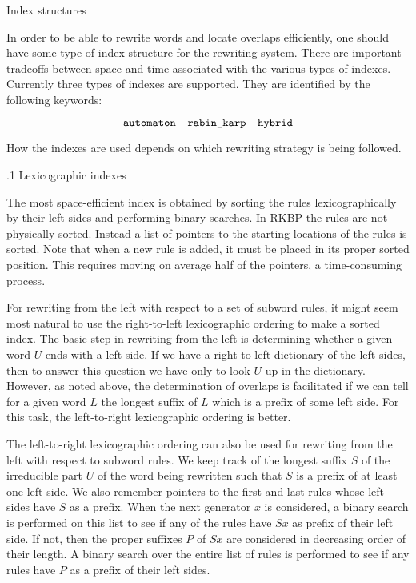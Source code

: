 \bigskip
{}  Index structures

\nobreak

In order to be able to rewrite words and locate overlaps efficiently,
one should have some type of index structure for the rewriting system.
There are important tradeoffs between space and time associated with
the various types of indexes.  Currently three types of indexes are
supported. They are identified by the following keywords:

$$\hbox{\tt automaton\quad rabin\_karp\quad hybrid}$$

\noindent How the indexes are used depends on which rewriting strategy
is being followed.

\bigskip
{}.1  Lexicographic indexes

\nobreak

The most space-efficient index is obtained by sorting the rules
lexicographically by their left sides and performing binary searches.
In RKBP the rules are not physically sorted.  Instead a list of
pointers to the starting locations of the rules is sorted.  Note that
when a new rule is added, it must be placed in its proper sorted
position.  This requires moving on average half of the pointers, a
time-consuming process.

For rewriting from the left with respect to a set of subword rules, it
might seem most natural to use the right-to-left lexicographic
ordering to make a sorted index. The basic step in rewriting from the
left is determining whether a given word $U$ ends with a left side. If
we have a right-to-left dictionary of the left sides, then to answer
this question we have only to look $U$ up in the dictionary. However,
as noted above, the determination of overlaps is facilitated if we can
tell for a given word $L$ the longest suffix of $L$ which is a prefix
of some left side. For this task, the left-to-right lexicographic
ordering is better.

The left-to-right lexicographic ordering can also be used for
rewriting from the left with respect to subword rules. We keep track
of the longest suffix $S$ of the irreducible part $U$ of the word
being rewritten such that $S$ is a prefix of at least one left side.
We also remember pointers to the first and last rules whose left sides
have $S$ as a prefix. When the next generator $x$ is considered, a
binary search is performed on this list to see if any of the rules
have $Sx$ as prefix of their left side. If not, then the proper
suffixes $P$ of $Sx$ are considered in decreasing order of their
length. A binary search over the entire list of rules is performed to
see if any rules have $P$ as a prefix of their left sides.

